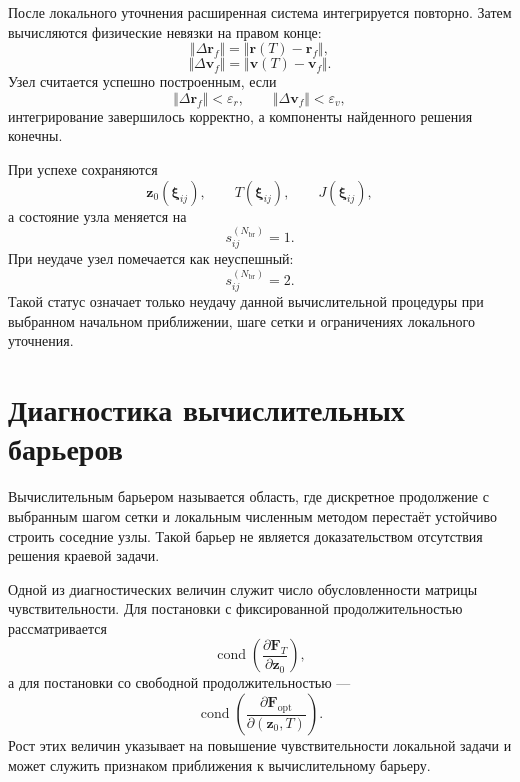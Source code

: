 После локального уточнения расширенная система интегрируется повторно. Затем вычисляются физические невязки на правом конце:
\begin{equation}
	\Vert\Delta\mathbf r_f\Vert
	=
	\Vert\mathbf r(T)-\mathbf r_f\Vert,
\end{equation}
\begin{equation}
	\Vert\Delta\mathbf v_f\Vert
	=
	\Vert\mathbf v(T)-\mathbf v_f\Vert.
\end{equation}
Узел считается успешно построенным, если
\begin{equation}
	\Vert\Delta\mathbf r_f\Vert<\varepsilon_r,
	\qquad
	\Vert\Delta\mathbf v_f\Vert<\varepsilon_v,
\end{equation}
интегрирование завершилось корректно, а компоненты найденного решения конечны.

При успехе сохраняются
\begin{equation}
	\mathbf z_0(\boldsymbol\xi_{ij}),
	\qquad
	T(\boldsymbol\xi_{ij}),
	\qquad
	J(\boldsymbol\xi_{ij}),
\end{equation}
а состояние узла меняется на
\begin{equation}
	s_{ij}^{(N_{\mathrm{br}})}=1.
\end{equation}
При неудаче узел помечается как неуспешный:
\begin{equation}
	s_{ij}^{(N_{\mathrm{br}})}=2.
\end{equation}
Такой статус означает только неудачу данной вычислительной процедуры при выбранном начальном приближении, шаге сетки и ограничениях локального уточнения.

\section*{Диагностика вычислительных барьеров}

Вычислительным барьером называется область, где дискретное продолжение с выбранным шагом сетки и локальным численным методом перестаёт устойчиво строить соседние узлы. Такой барьер не является доказательством отсутствия решения краевой задачи.

Одной из диагностических величин служит число обусловленности матрицы чувствительности. Для постановки с фиксированной продолжительностью рассматривается
\begin{equation}
	\operatorname{cond}
	\left(
	\frac{\partial\mathbf F_T}{\partial\mathbf z_0}
	\right),
\end{equation}
а для постановки со свободной продолжительностью —
\begin{equation}
	\operatorname{cond}
	\left(
	\frac{\partial\mathbf F_{\mathrm{opt}}}{\partial(\mathbf z_0,T)}
	\right).
\end{equation}
Рост этих величин указывает на повышение чувствительности локальной задачи и может служить признаком приближения к вычислительному барьеру.

